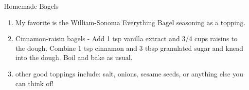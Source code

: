 \begin{recipe}[source = Sally's Baking Addiction]{Homemade Bagels}
{\begin{enumerate}
						\item My favorite is the William-Sonoma Everything Bagel seasoning as a topping.
						\item Cinnamon-raisin bagels - Add 1 tsp vanilla extract and 3/4 cups raisins to the dough. Combine 1 tsp cinnamon and 3 tbsp granulated sugar and knead into the dough. Boil and bake as usual.
		\item other good toppings include: salt, onions, sesame seeds, or anything else you can think of!\end{enumerate}} 

						\end{recipe}
